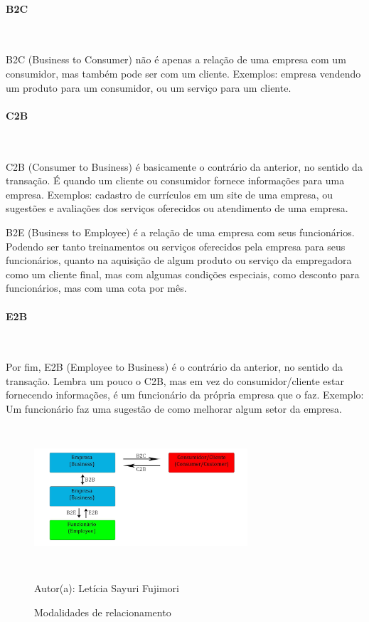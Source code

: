 \paragraph{B2C}\mbox{}\\
\par
B2C (Business to Consumer) não é apenas a relação de uma empresa com um consumidor, mas também pode ser com um cliente. Exemplos: empresa vendendo um produto para um consumidor, ou um serviço para um cliente.

\paragraph{C2B}\mbox{}\\
\par
C2B (Consumer to Business) é basicamente o contrário da anterior, no sentido da transação. É quando um cliente ou consumidor fornece informações para uma empresa. Exemplos: cadastro de currículos em um site de uma empresa, ou sugestões e avaliações dos serviços oferecidos ou atendimento de uma empresa.


\par
B2E (Business to Employee) é a relação de uma empresa com seus funcionários. Podendo ser tanto treinamentos ou serviços oferecidos pela empresa para seus funcionários, quanto na aquisição de algum produto ou serviço da empregadora como um cliente final, mas com algumas condições especiais, como desconto para funcionários, mas com uma cota por mês.

\paragraph{E2B}\mbox{}\\
\par
Por fim, E2B (Employee to Business) é o contrário da anterior, no sentido da transação. Lembra um pouco o C2B, mas em vez do consumidor/cliente estar fornecendo informações, é um funcionário da própria empresa que o faz. Exemplo: Um funcionário faz uma sugestão de como melhorar algum setor da empresa.
 \begin{figure}[!h]
	\centering
	\caption{Modalidades de relacionamento}
	\includegraphics[width=300px, height=200px]{./images/2-7.jpg}
	\par{Autor(a): Letícia Sayuri Fujimori}
\end{figure}

